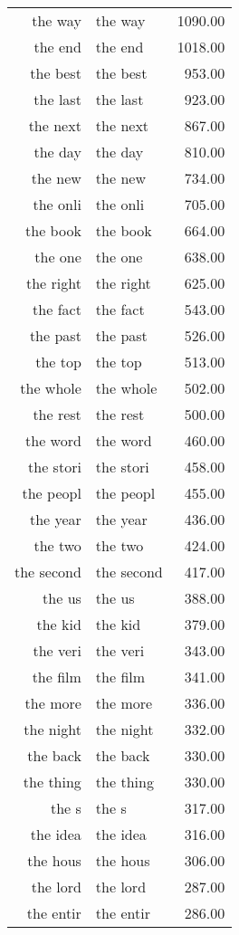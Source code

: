 \begin{table}[ht]
\begin{tabular}{rlr}
  the way & the way & 1090.00 \\ 
  the end & the end & 1018.00 \\ 
  the best & the best & 953.00 \\ 
  the last & the last & 923.00 \\ 
  the next & the next & 867.00 \\ 
  the day & the day & 810.00 \\ 
  the new & the new & 734.00 \\ 
  the onli & the onli & 705.00 \\ 
  the book & the book & 664.00 \\ 
  the one & the one & 638.00 \\ 
  the right & the right & 625.00 \\ 
  the fact & the fact & 543.00 \\ 
  the past & the past & 526.00 \\ 
  the top & the top & 513.00 \\ 
  the whole & the whole & 502.00 \\ 
  the rest & the rest & 500.00 \\ 
  the word & the word & 460.00 \\ 
  the stori & the stori & 458.00 \\ 
  the peopl & the peopl & 455.00 \\ 
  the year & the year & 436.00 \\ 
  the two & the two & 424.00 \\ 
  the second & the second & 417.00 \\ 
  the us & the us & 388.00 \\ 
  the kid & the kid & 379.00 \\ 
  the veri & the veri & 343.00 \\ 
  the film & the film & 341.00 \\ 
  the more & the more & 336.00 \\ 
  the night & the night & 332.00 \\ 
  the back & the back & 330.00 \\ 
  the thing & the thing & 330.00 \\ 
  the s & the s & 317.00 \\ 
  the idea & the idea & 316.00 \\ 
  the hous & the hous & 306.00 \\ 
  the lord & the lord & 287.00 \\ 
  the entir & the entir & 286.00 \\ 

\end{tabular}
\end{table}

